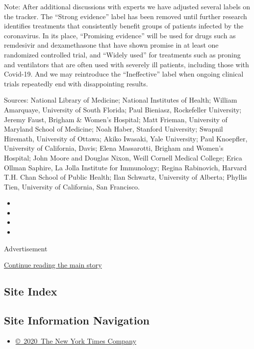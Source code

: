 Note: After additional discussions with experts we have adjusted several
labels on the tracker. The ``Strong evidence'' label has been removed
until further research identifies treatments that consistently benefit
groups of patients infected by the coronavirus. In its place,
``Promising evidence'' will be used for drugs such as remdesivir and
dexamethasone that have shown promise in at least one randomized
controlled trial, and ``Widely used'' for treatments such as proning and
ventilators that are often used with severely ill patients, including
those with Covid-19. And we may reintroduce the ``Ineffective'' label
when ongoing clinical trials repeatedly end with disappointing results.

Sources: National Library of Medicine; National Institutes of Health;
William Amarquaye, University of South Florida; Paul Bieniasz,
Rockefeller University; Jeremy Faust, Brigham \& Women's Hospital; Matt
Frieman, University of Maryland School of Medicine; Noah Haber, Stanford
University; Swapnil Hiremath, University of Ottawa; Akiko Iwasaki, Yale
University; Paul Knoepfler, University of California, Davis; Elena
Massarotti, Brigham and Women's Hospital; John Moore and Douglas Nixon,
Weill Cornell Medical College; Erica Ollman Saphire, La Jolla Institute
for Immunology; Regina Rabinovich, Harvard T.H. Chan School of Public
Health; Ilan Schwartz, University of Alberta; Phyllis Tien, University
of California, San Francisco.

\begin{itemize}
\item
\item
\item
\item
\end{itemize}

Advertisement

\protect\hyperlink{after-bottom}{Continue reading the main story}

\hypertarget{site-index}{%
\subsection{Site Index}\label{site-index}}

\hypertarget{site-information-navigation}{%
\subsection{Site Information
Navigation}\label{site-information-navigation}}

\begin{itemize}
\tightlist
\item
  \href{https://help.nytimes3xbfgragh.onion/hc/en-us/articles/115014792127-Copyright-notice}{©~2020~The
  New York Times Company}
\end{itemize}

